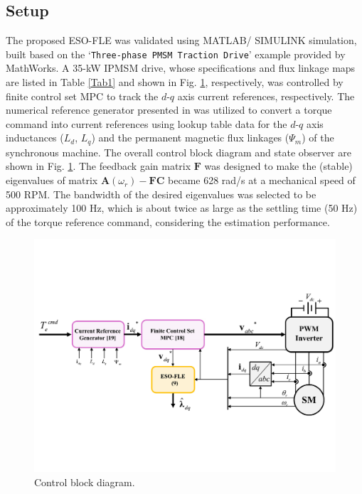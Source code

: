 \documentclass[conference]{IEEEtran}
\begin{document}
\subsection{Setup}
The proposed ESO-FLE was validated using MATLAB/ SIMULINK simulation, built based on the `\texttt{Three-phase PMSM Traction Drive}' example provided by MathWorks.
A 35-kW IPMSM drive, whose specifications and flux linkage maps are listed in Table \ref{Tab1} and shown in Fig. \ref{Fig3}, respectively, was controlled by finite control set MPC \cite{b15} to track the $d$-$q$ axis current references, respectively. The numerical reference generator presented in \cite{b16} was utilized to convert a torque command into current references using lookup table data for the $d$-$q$ axis inductances ($L_d$, $L_q$) and the permanent magnetic flux linkages ($\Psi_m$) of the synchronous machine. The overall control block diagram and state observer are shown in Fig. \ref{Fig3}. The feedback gain matrix ${{\boldsymbol{F}}}$ was designed to make the (stable) eigenvalues of matrix ${{\boldsymbol{A}}({\omega}_{r})} - {{\boldsymbol{F}}} {{\boldsymbol{C}}}$ became 628 rad/s at a mechanical speed of 500 RPM. The bandwidth of the desired eigenvalues was selected to be approximately 100 Hz, which is about twice as large as the settling time (50 Hz) of the torque reference command, considering the estimation performance.
 \begin{figure}
    \centering
    \captionsetup{font=footnotesize}
    \includegraphics[width=1.4 \columnwidth ]{Fig3_1.pdf}
    \caption{Control block diagram.}\label{Fig3}
 \end{figure}
 
\end{document}
